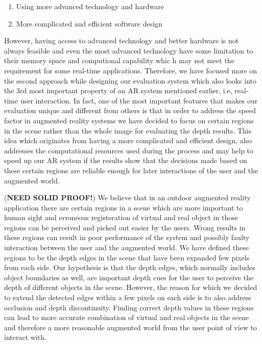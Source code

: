 \documentclass[dvips,letterpaper,12pt]{report}
\begin{document}
\begin{enumerate}
\item Using more advanced technology and hardware
\item More complicated and efficient software design
\end{enumerate}
However, having access to advanced technology and better hardware is not always feasible and even the most advanced technology have some limitation to their memory space and computional capability whic
h may not meet the requirement for some real-time applications. 
Therefore, we have focused more on the second approach while designing our evaluation system which also looks into the 3rd most important property of
an AR system mentioned earlier, i.e, real-time user interaction. \newline 
In fact, one of the most important features that makes our evaluation unique and different from others is that in order to
address the speed factor in augmented reality systems we have decided to focus on certain regions in the scene rather than the whole image for evaluating the depth results. 
This idea which originates from having a more complicated and efficient design, also addresses the computational resources used during the process and may help to speed up our AR system if 
the results show that the decisions made based on these certain regions are reliable enough for later interactions of the user and the augmented world.

(\textbf{NEED SOLID PROOF!}) We believe that in an outdoor augmented reality application there are certain regions in a scene which are more important to human sight and erroneous registeration of virtual and 
real object in those regions can be perceived and picked out easier by the users. Wrong results in these regions can result in poor performance of the system and possibly faulty interaction between 
the user and the augmented world. We have defined these regions to be the depth edges in the scene that have been expanded few pixels from each side. 
Our hypothesis is that the depth edges, which normally includes object boundaries as well, are important depth cues for the user to perceive the depth of different objects in the scene. 
However, the reason for which we decided to extend the detected edges within a few pixels on each side is to also address occlusion and depth discontinuity. Finding correct depth values in these 
regions can lead to more accurate combination of virtual and real objects in the scene and therefore a more reasonable augmented world from the user point of view to interact with. \newline
\newline
\end{document}
